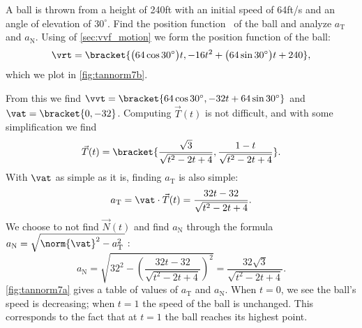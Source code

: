 \begin{example}\label{ex_tannorm7}
A ball is thrown from a height of 240ft with an initial speed of 64ft/s and an angle of elevation of $30^\circ$. Find the position function \vrt\ of the ball and analyze $a_\mathrm{T}$ and $a_\mathrm{N}$.
\solution
Using  of \autoref{sec:vvf_motion} we form the position function of the ball:
\[
\vrt =\bracket{\bigl(64\cos 30^\circ\bigr)t, -16t^2+\bigl(64\sin 30^\circ\bigr)t+240},
\]
which we plot in \autoref{fig:tannorm7b}.


From this we find $\vvt =\bracket{64\cos 30^\circ, -32t+64\sin 30^\circ}$ and $\vat =\bracket{0,-32}$. Computing $\vec T(t)$ is not difficult, and with some simplification we find
\[\vec T(t) =\bracket{\frac{\sqrt{3}}{\sqrt{t^2-2t+4}}, \frac{1-t}{\sqrt{t^2-2t+4}}}.\]
With $\vat$ as simple as it is, finding $a_\mathrm{T}$ is also  simple:
\[a_\mathrm{T} = \vat\cdot \vec T(t) = \frac{32t-32}{\sqrt{t^2-2t+4}}.\]
We choose to not find $\vec N(t)$ and find $a_\mathrm{N}$ through the formula $a_\mathrm{N} = \sqrt{\norm{\vat}^2-a_\mathrm{T}^2\,}$\,:
\[a_\mathrm{N} = \sqrt{32^2-\left(\frac{32t-32}{\sqrt{t^2-2t+4}}\right)^2} = \frac{32\sqrt{3}}{\sqrt{t^2-2t+4}}.\]
\autoref{fig:tannorm7a} gives a table of values of $a_\mathrm{T}$ and $a_\mathrm{N}$. When $t=0$, we see the ball's speed is decreasing; when $t=1$ the speed of the ball is unchanged. This corresponds to the fact that at $t=1$ the ball reaches its highest point.


\end{example}
